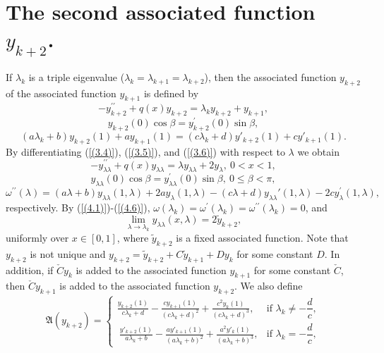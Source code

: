 \documentclass[10pt,a4paper]{amsart}
\numberwithin{equation}{section}
\begin{document}
\section{The second associated function \(y_{k + 2}\).}
If \(\lambda_{k}\) is a triple  eigenvalue
(\(\lambda_{k} = \lambda_{k + 1}=\lambda_{k + 2}\)), then the associated function
\(y_{k + 2}\) of the associated function \(y_{k+1}\) is defined by
\begin{equation}
 -y_{k+2}^{\prime \prime }+q(x)y_{k+2}=\lambda _{k}y_{k+2}+y_{k+1}, \label{(4.1)}  
\end{equation}
\begin{equation}
   y_{k+2}(0)\cos \beta  =y_{k+2}^{\prime }(0)\sin \beta,     \label{(4.2)}
\end{equation}
\begin{equation}
 \left( a\lambda_{k} + b \right)y_{k + 2}(1) + ay_{k + 1}(1) = \left( c\lambda_{k} + d \right)y'_{k + 2}(1) + cy'_{k + 1}(1).  \label{(4.3)}   
\end{equation}
By differentiating (\ref{(3.4)}), (\ref{(3.5)}), and (\ref{(3.6)}) with respect to $\lambda$ we obtain 
\begin{equation}
  -y_{\lambda\lambda}^{\prime \prime }+q(x)y_{\lambda\lambda}=\lambda y_{\lambda\lambda}+2y_{\lambda},\ 0<x<1,  \label{(4.4)} 
\end{equation}
\begin{equation}
y_{\lambda\lambda}(0)\cos \beta =y_{\lambda\lambda}^{\prime }(0)\sin \beta ,\ 0\leq \beta <\pi ,
\label{(4.5)}
\end{equation}
\begin{equation}
 \omega^{\prime\prime}(\lambda) = (a\lambda + b)y_{\lambda\lambda}(1,\lambda)+2ay_\lambda(1,\lambda) - (c\lambda + d)y_{\lambda\lambda}{'}(1,\lambda)-2cy_\lambda^\prime(1,\lambda),\label{(4.6)}   
\end{equation}
respectively. By (\ref{(4.1)})-(\ref{(4.6)}), \(\omega(\lambda_k)=\omega^\prime(\lambda_k)=\omega^{\prime\prime}(\lambda_k)=0\), and 
$$\lim_{\lambda\to\lambda_k}y_{\lambda\lambda}(x,\lambda)=2\tilde{y}_{k+2},$$uniformly over $x\in[0,1]$, where $\tilde{y}_{k+2}$ is a fixed associated function. Note that $y_{k + 2}$ is not unique and $y_{k + 2}=\tilde{y}_{k+2}+C\tilde{y}_{k+1}+Dy_k$ for some constant $D$. In addition, if $\check{C}y_k$ is added to the associated function $y_{k+1}$ for some constant $\check{C}$, then $\check{C}y_{k+1}$ is added to the associated function $y_{k+2}$. We also define 
\begin{equation}
\mathfrak{A}(y_{k+2}) =
\begin{cases}
\displaystyle  
\frac{y_{k + 2}(1)}{c\lambda_{k} + d} - \frac{cy_{k+1}(1)}{\left( c\lambda_{k} + d \right)^{2}}
+\frac{c^2y_{k}(1)}{\left( c\lambda_{k} + d \right)^{3}}, 
&  \text{if }  \lambda_k \neq -\dfrac{d}{c}, \\[10pt]
\displaystyle \ 
\frac{y'_{k + 2}(1)}{a\lambda_{k} + b} - \frac{ay'_{k+1}(1)}{\left( a\lambda_{k} + b \right)^{2}}
+\frac{a^2y'_{k}(1)}{\left( a\lambda_{k} + b\right)^{3}}, 
& \text{if } \lambda_k = -\dfrac{d}{c},
\end{cases}\label{(4.7)}
\end{equation}
\end{document}
